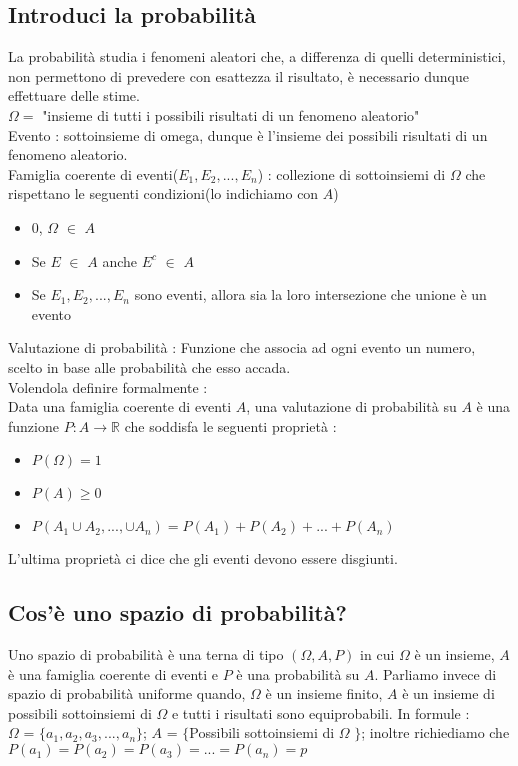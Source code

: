 \documentclass[a4paper,12pt]{report}
\begin{document}
	\subsection{Introduci la probabilità}
	La probabilità studia i fenomeni aleatori che, a differenza di quelli deterministici, non permettono di prevedere con esattezza il risultato, è necessario dunque effettuare delle stime. \\
	$\Omega = $ "insieme di tutti i possibili risultati di un fenomeno aleatorio" \\
	Evento : sottoinsieme di omega, dunque è l'insieme dei possibili risultati di un fenomeno aleatorio. \\
	Famiglia coerente di eventi($E_1, E_2, ..., E_n$) : collezione di sottoinsiemi di $\Omega$ che rispettano le seguenti condizioni(lo indichiamo con $A$)
	\begin{itemize}
		\item 0, $\Omega$ $\in$ $A$
		\item Se $E$ $\in$ $A$ anche $E^c$ $\in$ $A$
		\item Se $E_1, E_2, ..., E_n$ sono eventi, allora sia la loro intersezione che unione è un evento
	\end{itemize}
	Valutazione di probabilità : Funzione che associa ad ogni evento un numero, scelto in base alle probabilità che esso accada. \\
	Volendola definire formalmente : \\
	Data una famiglia coerente di eventi $A$, una valutazione di probabilità su $A$ è una funzione $P : A \rightarrow \mathbb{R}$ che soddisfa le seguenti proprietà : 
	\begin{itemize}
		\item $P(\Omega) = 1$
		\item $P(A) \geq 0$
		\item $P(A_1 \cup A_2, ..., \cup A_n) = P(A_1) + P(A_2) + ... + P(A_n)$
	\end{itemize}
	L'ultima proprietà ci dice che gli eventi devono essere disgiunti.
	\subsection{Cos'è uno spazio di probabilità?}
	Uno spazio di probabilità è una terna di tipo $(\Omega, A, P)$ in cui $\Omega$ è un insieme, $A$ è una famiglia coerente di eventi e $P$ è una probabilità su $A$. Parliamo invece di spazio di probabilità uniforme quando, $\Omega$ è un insieme finito, $A$ è un insieme di possibili sottoinsiemi di $\Omega$ e tutti i risultati sono equiprobabili. In formule : \\
	$\Omega$ = $\{a_1, a_2, a_3, ..., a_n\}$; $A$ = $\{$Possibili sottoinsiemi di $\Omega$ $\}$; inoltre richiediamo che $P(a_1) = P(a_2) = P(a_3) = ... = P(a_n) = p$
\end{document}
